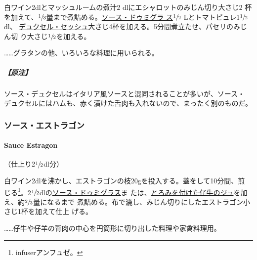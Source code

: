 白ワイン2dlとマッシュルームの煮汁2 dlにエシャロットのみじん切り大さじ2
杯を加えて、\(\sfrac{1}{3}\)量まで煮詰める。\protect\hyperlink{sauce-demi-glace}{ソース・ドゥミグラ
ス}\(\sfrac{1}{2}\) Lとトマトピュレ1\(\sfrac{1}{2}\) dl、
\href{}{デュクセル・セッシュ}大さじ4杯を加える。5分間煮立たせ、パセリのみじん切
り大さじ\(\sfrac{1}{2}\)を加える。

\ldots{}\ldots{}グラタンの他、いろいろな料理に用いられる。

\hypertarget{ux539fux6ce8-1}{%
\subparagraph{【原注】}\label{ux539fux6ce8-1}}

ソース・デュクセルはイタリア風ソースと混同されることが多いが、ソース・
デュクセルにはハムも、赤く漬けた舌肉も入れないので、まったく別のものだ。

\maeaki

\hypertarget{ux30bdux30fcux30b9ux30a8ux30b9ux30c8ux30e9ux30b4ux30f3}{%
\subsubsection{ソース・エストラゴン}\label{ux30bdux30fcux30b9ux30a8ux30b9ux30c8ux30e9ux30b4ux30f3}}

\hypertarget{sauce-estragon}{%
\paragraph{Sauce Estragon}\label{sauce-estragon}}


（仕上り2\(\sfrac{1}{2}\)dl分）

白ワイン2dlを沸かし、エストラゴンの枝20gを投入する。蓋をして10分間、煎
じる\footnote{infuserアンフュゼ。}。2\(\sfrac{1}{2}\)dlの\protect\hyperlink{sauce-demi-glace}{ソース・ドゥミグラス}ま
たは、\protect\hyperlink{jus-de-veau-lie}{とろみを付けた仔牛のジュ}を加え、約\(\sfrac{2}{3}\)量になるまで
煮詰める。布で漉し、みじん切りにしたエストラゴン小さじ1杯を加えて仕上
げる。

\ldots{}\ldots{}仔牛や仔羊の背肉の中心を円筒形に切り出した料理や家禽料理用。

\maeaki

